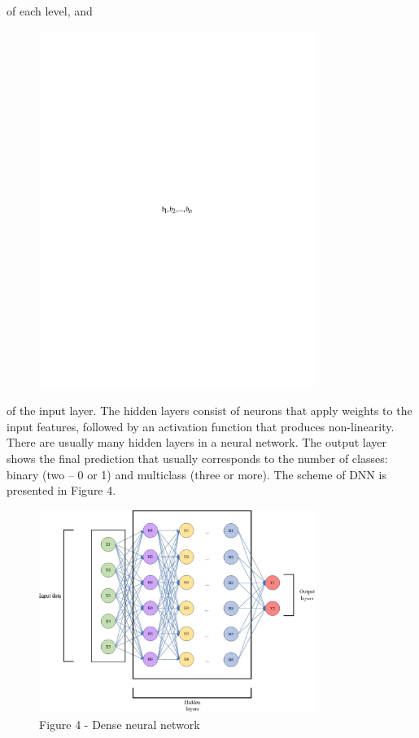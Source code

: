 of each level, and
\begin{figure}[H]
	\centering
	\includegraphics[width=0.8\textwidth]{media/ict/image43}
	\caption*{}
\end{figure}

of the input layer. The hidden layers consist of neurons that apply
weights to the input features, followed by an activation function that
produces non-linearity. There are usually many hidden layers in a neural
network. The output layer shows the final prediction that usually
corresponds to the number of classes: binary (two -- 0 or 1) and
multiclass (three or more). The scheme of DNN is presented in Figure 4.

\begin{figure}[H]
	\centering
	\includegraphics[width=0.8\textwidth]{media/ict/image44}
	\caption*{Figure 4 - Dense neural network}
\end{figure}

